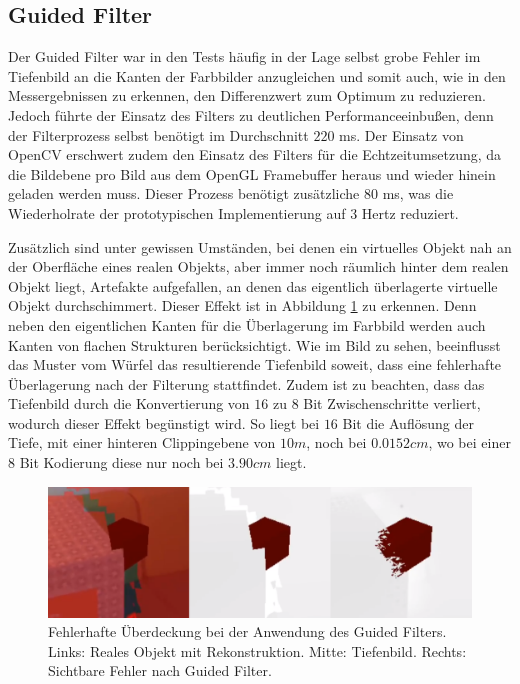 \subsection*{Guided Filter}

Der Guided Filter war in den Tests häufig in der Lage selbst grobe Fehler im Tiefenbild an die Kanten der Farbbilder anzugleichen und somit auch, wie in den Messergebnissen zu erkennen, den Differenzwert zum Optimum zu reduzieren. Jedoch führte der Einsatz des Filters zu deutlichen Performanceeinbußen, denn der Filterprozess selbst benötigt im Durchschnitt \(220\) ms. Der Einsatz von OpenCV erschwert zudem den Einsatz des Filters für die Echtzeitumsetzung, da die Bildebene pro Bild aus dem OpenGL Framebuffer heraus und wieder hinein geladen werden muss. Dieser Prozess benötigt zusätzliche \(80\) ms, was die Wiederholrate der prototypischen Implementierung auf 3 Hertz reduziert. 

Zusätzlich sind unter gewissen Umständen, bei denen ein virtuelles Objekt nah an der Oberfläche eines realen Objekts, aber immer noch räumlich hinter dem realen Objekt liegt, Artefakte aufgefallen, an denen das eigentlich überlagerte virtuelle Objekt durchschimmert. Dieser Effekt ist in Abbildung \ref{fig:artifacts} zu erkennen. Denn neben den eigentlichen Kanten für die Überlagerung im Farbbild werden auch Kanten von flachen Strukturen berücksichtigt. Wie im Bild zu sehen, beeinflusst das Muster vom Würfel das resultierende Tiefenbild soweit, dass eine fehlerhafte Überlagerung nach der Filterung stattfindet. Zudem ist zu beachten, dass das Tiefenbild durch die Konvertierung von \(16\) zu \(8\) Bit Zwischenschritte verliert, wodurch dieser Effekt begünstigt wird. So liegt bei \(16\) Bit die Auflösung der Tiefe, mit einer hinteren Clippingebene von \(10 m\), noch bei \(0.0152 cm\), wo bei einer \(8\) Bit Kodierung diese nur noch bei \(3.90 cm\) liegt.
 
\begin{figure}[h]
  \centering
	\includegraphics[width=1.0\textwidth]{content/images/artifacts.png} 
  \caption{Fehlerhafte Überdeckung bei der Anwendung des Guided Filters. Links: Reales Objekt mit Rekonstruktion. Mitte: Tiefenbild. Rechts: Sichtbare Fehler nach Guided Filter.}
  \label{fig:artifacts}
\end{figure}

